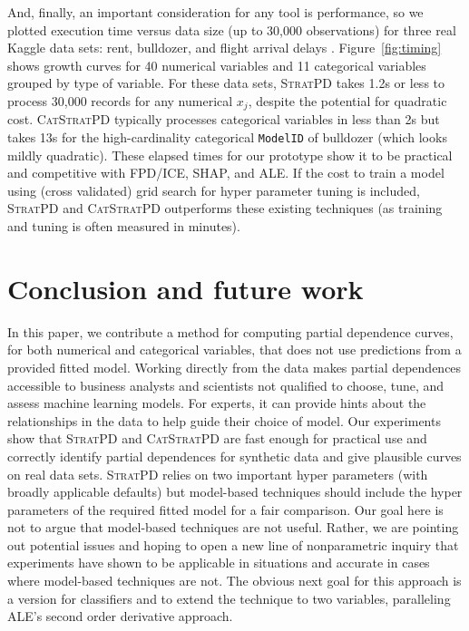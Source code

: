 \documentclass[smallextended]{svjour3}       %
\newcommand{\figref}[1]{Figure~\ref{#1}}
\newcommand{\cut}[1]{}
\newcommand{\spd}{\fontfamily{cmr}\textsc{\small StratPD}}
\newcommand{\cspd}{\fontfamily{cmr}\textsc{\small CatStratPD}}
\begin{document}
And, finally, an important consideration for any tool is performance, so we plotted execution time versus data size (up to 30,000 observations) for three real Kaggle data sets: rent, bulldozer, and flight arrival delays \cite{flights}. \figref{fig:timing} shows growth curves for 40 numerical variables and 11 categorical variables grouped by type of variable.  For these data sets, \spd{} takes 1.2s or less to process 30,000 records for any  numerical $x_j$, despite the potential for quadratic cost. \cspd{} typically processes categorical variables in less than 2s but takes 13s for the high-cardinality categorical {\tt\small ModelID} of bulldozer (which looks mildly quadratic).  These elapsed times for our prototype show it to be practical and competitive with FPD/ICE, SHAP, and ALE.  If the cost to train a model using (cross validated) grid search for hyper parameter tuning is included, \spd{} and \cspd{} outperforms these existing techniques (as training and tuning is often measured in minutes).


\cut{
flight shape (5714008, 17), 6 cats
rent shape (49352, 20), no cats
bulldozer shape (362781, 14) records, 5 cats
}

\section{Conclusion and future work}

In this paper, we contribute a method for computing partial dependence curves, for both numerical and categorical variables, that does not use  predictions from a provided fitted model.   Working directly from the data  makes partial dependences accessible to business analysts and scientists not qualified to choose, tune, and assess machine learning models.  For experts, it can  provide hints about the relationships in the data to help guide their choice of model. Our experiments show that \spd{} and \cspd{} are fast enough for practical use and correctly identify partial dependences for synthetic data and give plausible curves on real data sets. \spd{} relies on two important hyper parameters (with broadly applicable defaults) but model-based techniques should include the hyper parameters of the required fitted model for a fair comparison.  Our goal here is not to  argue  that model-based techniques are not useful. Rather, we are pointing out potential issues and hoping to open a new line of nonparametric inquiry that experiments have shown to be applicable in situations and accurate in cases where model-based techniques are not. The obvious next goal for this approach is a version for classifiers and to extend the technique to two variables, paralleling ALE's second order derivative approach.
\end{document}
